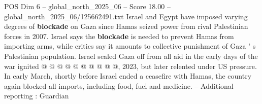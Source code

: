 \begin{textsample}{POS Dim 6 – global\_north\_2025\_06 – Score 18.00 – global\_north\_2025\_06/125662491.txt}
Israel and Egypt have imposed varying degrees of \textbf{blockade} on Gaza since Hamas seized power from rival Palestinian forces in 2007.
Israel says the \textbf{blockade} is needed to prevent Hamas from importing arms, while critics say it amounts to collective punishment of Gaza ' s Palestinian population.
Israel sealed Gaza off from all aid in the early days of the war ignited @ @ @ @ @ @ @ @ @ @, 2023, but later relented under US pressure.
In early March, shortly before Israel ended a ceasefire with Hamas, the country again blocked all imports, including food, fuel and medicine. -- Additional reporting : Guardian

\end{textsample}
